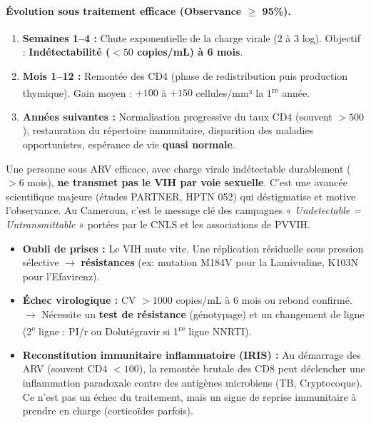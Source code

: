 \documentclass[11pt]{article}
\begin{document}
\paragraph{Évolution sous traitement efficace (Observance $\ge$ 95\%).}
\begin{enumerate}
    \item \textbf{Semaines 1--4 :} Chute exponentielle de la charge virale (2 à 3 log). Objectif : \textbf{Indétectabilité ($< 50$ copies/mL) à 6 mois}.
    \item \textbf{Mois 1--12 :} Remontée des CD4 (phase de redistribution puis production thymique). Gain moyen : $+100$ à $+150$ cellules/mm³ la 1\textsuperscript{re} année.
    \item \textbf{Années suivantes :} Normalisation progressive du taux CD4 (souvent $> 500$), restauration du répertoire immunitaire, disparition des maladies opportunistes, espérance de vie \textbf{quasi normale}.
\end{enumerate}

\begin{aretenir}[I = I : Indétectable = Intransmissible]
Une personne sous ARV efficace, avec charge virale indétectable durablement ($> 6$ mois), \textbf{ne transmet pas le VIH par voie sexuelle}. C'est une avancée scientifique majeure (études PARTNER, HPTN 052) qui déstigmatise et motive l'observance. Au Cameroun, c'est le message clé des campagnes « \emph{Undetectable = Untransmittable} » portées par le CNLS et les associations de PVVIH.
\end{aretenir}

\begin{attention}
\begin{itemize}
    \item \textbf{Oubli de prises :} Le VIH mute vite. Une réplication résiduelle sous pression sélective $\rightarrow$ \textbf{résistances} (ex: mutation M184V pour la Lamivudine, K103N pour l'Efavirenz).
    \item \textbf{Échec virologique :} CV $> 1000$ copies/mL à 6 mois ou rebond confirmé. $\rightarrow$ Nécessite un \textbf{test de résistance} (génotypage) et un changement de ligne (2\textsuperscript{e} ligne : PI/r ou Dolutégravir si 1\textsuperscript{re} ligne NNRTI).
    \item \textbf{Reconstitution immunitaire inflammatoire (IRIS) :} Au démarrage des ARV (souvent CD4 $< 100$), la remontée brutale des CD8 peut déclencher une inflammation paradoxale contre des antigènes microbiens (TB, Cryptocoque). Ce n'est pas un échec du traitement, mais un signe de reprise immunitaire à prendre en charge (corticoïdes parfois).
\end{itemize}
\end{attention}
\end{document}
